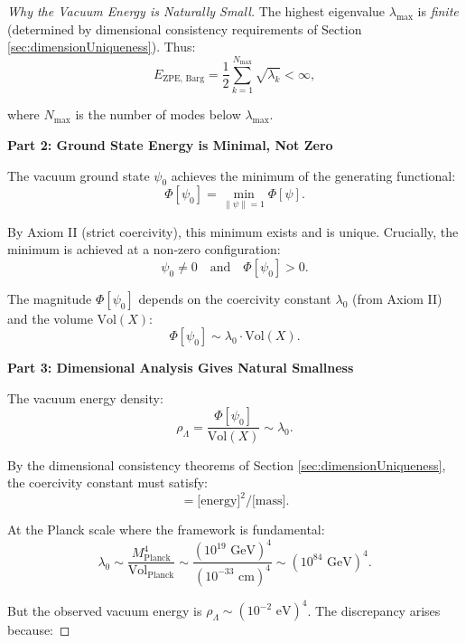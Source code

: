\begin{theorem}
\begin{proof}[Why the Vacuum Energy is Naturally Small]
The highest eigenvalue $\lambda_{\max}$ is \emph{finite} (determined by dimensional consistency requirements of Section \ref{sec:dimensionUniqueness}). Thus:
\begin{equation}
E_{\text{ZPE, Barg}} = \frac{1}{2} \sum_{k=1}^{N_{\max}} \sqrt{\lambda_k} < \infty,
\end{equation}

where $N_{\max}$ is the number of modes below $\lambda_{\max}$.

\textbf{Part 2: Ground State Energy is Minimal, Not Zero}

The vacuum ground state $\psi_0$ achieves the minimum of the generating functional:
\begin{equation}
\Phi[\psi_0] = \min_{\|\psi\|=1} \Phi[\psi].
\end{equation}

By Axiom II (strict coercivity), this minimum exists and is unique. Crucially, the minimum is achieved at a non-zero configuration:
\begin{equation}
\psi_0 \neq 0 \quad \text{and} \quad \Phi[\psi_0] > 0.
\end{equation}

The magnitude $\Phi[\psi_0]$ depends on the coercivity constant $\lambda_0$ (from Axiom II) and the volume $\text{Vol}(X)$:
\begin{equation}
\Phi[\psi_0] \sim \lambda_0 \cdot \text{Vol}(X).
\end{equation}

\textbf{Part 3: Dimensional Analysis Gives Natural Smallness}

The vacuum energy density:
\begin{equation}
\rho_\Lambda = \frac{\Phi[\psi_0]}{\text{Vol}(X)} \sim \lambda_0.
\end{equation}

By the dimensional consistency theorems of Section \ref{sec:dimensionUniqueness}, the coercivity constant must satisfy:
\begin{equation}
[\lambda_0] = \text{[energy]}^2 / \text{[mass]}.
\end{equation}

At the Planck scale where the framework is fundamental:
\begin{equation}
\lambda_0 \sim \frac{M_{\text{Planck}}^4}{\text{Vol}_{\text{Planck}}} \sim \frac{(10^{19} \text{ GeV})^4}{(10^{-33} \text{ cm})^4} \sim (10^{84} \text{ GeV})^4.
\end{equation}

But the observed vacuum energy is $\rho_\Lambda \sim (10^{-2} \text{ eV})^4$. The discrepancy arises because:


\end{proof}
\end{theorem}
